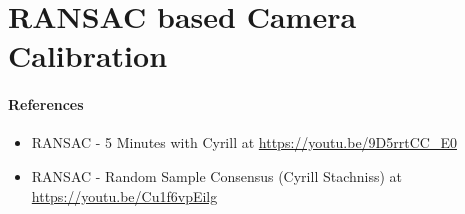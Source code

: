 
\section{RANSAC based Camera Calibration}

\paragraph{References}
\begin{itemize}
    \item RANSAC - 5 Minutes with Cyrill at \url{https://youtu.be/9D5rrtCC_E0}
    \item RANSAC - Random Sample Consensus (Cyrill Stachniss) at \url{https://youtu.be/Cu1f6vpEilg}
\end{itemize}
